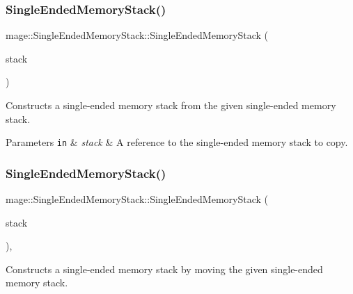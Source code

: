\subsubsection{\texorpdfstring{Single\+Ended\+Memory\+Stack()}{SingleEndedMemoryStack()}\hspace{0.1cm}{\footnotesize\ttfamily [2/3]}}
{\footnotesize\ttfamily mage\+::\+Single\+Ended\+Memory\+Stack\+::\+Single\+Ended\+Memory\+Stack (\begin{DoxyParamCaption}\item[{const \mbox{\hyperlink{classmage_1_1_single_ended_memory_stack}{Single\+Ended\+Memory\+Stack}} \&}]{stack }\end{DoxyParamCaption})\hspace{0.3cm}{\ttfamily [delete]}}

Constructs a single-\/ended memory stack from the given single-\/ended memory stack.


\begin{DoxyParams}[1]{Parameters}
\mbox{\tt in}  & {\em stack} & A reference to the single-\/ended memory stack to copy. \\
\hline
\end{DoxyParams}
\mbox{\label{classmage_1_1_single_ended_memory_stack_afd6632eac3ada6ea88a69b586f27a4e4}} 
\subsubsection{\texorpdfstring{Single\+Ended\+Memory\+Stack()}{SingleEndedMemoryStack()}\hspace{0.1cm}{\footnotesize\ttfamily [3/3]}}
{\footnotesize\ttfamily mage\+::\+Single\+Ended\+Memory\+Stack\+::\+Single\+Ended\+Memory\+Stack (\begin{DoxyParamCaption}\item[{\mbox{\hyperlink{classmage_1_1_single_ended_memory_stack}{Single\+Ended\+Memory\+Stack}} \&\&}]{stack }\end{DoxyParamCaption})\hspace{0.3cm}{\ttfamily [default]}, {\ttfamily [noexcept]}}

Constructs a single-\/ended memory stack by moving the given single-\/ended memory stack.


